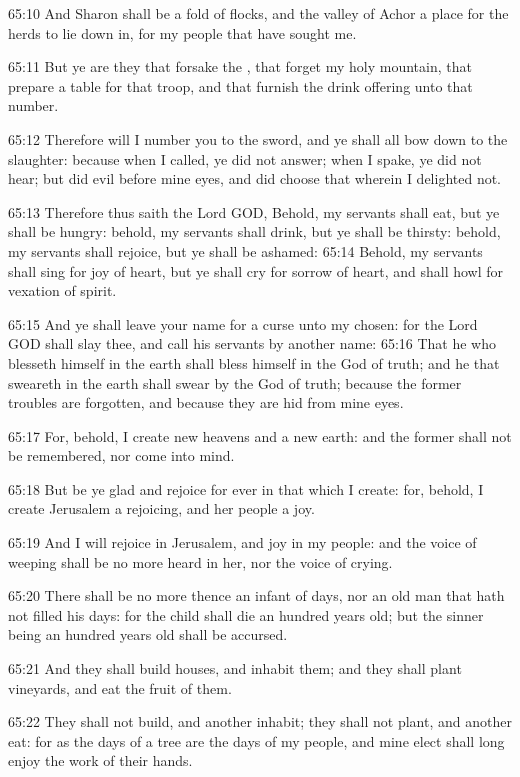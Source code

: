 65:10 And Sharon shall be a fold of flocks, and the valley of Achor a
place for the herds to lie down in, for my people that have sought me.

65:11 But ye are they that forsake the \LORD, that forget my holy
mountain, that prepare a table for that troop, and that furnish the
drink offering unto that number.

65:12 Therefore will I number you to the sword, and ye shall all bow
down to the slaughter: because when I called, ye did not answer; when
I spake, ye did not hear; but did evil before mine eyes, and did
choose that wherein I delighted not.

65:13 Therefore thus saith the Lord GOD, Behold, my servants shall
eat, but ye shall be hungry: behold, my servants shall drink, but ye
shall be thirsty: behold, my servants shall rejoice, but ye shall be
ashamed: 65:14 Behold, my servants shall sing for joy of heart, but ye
shall cry for sorrow of heart, and shall howl for vexation of spirit.

65:15 And ye shall leave your name for a curse unto my chosen: for the
Lord GOD shall slay thee, and call his servants by another name: 65:16
That he who blesseth himself in the earth shall bless himself in the
God of truth; and he that sweareth in the earth shall swear by the God
of truth; because the former troubles are forgotten, and because they
are hid from mine eyes.

65:17 For, behold, I create new heavens and a new earth: and the
former shall not be remembered, nor come into mind.

65:18 But be ye glad and rejoice for ever in that which I create: for,
behold, I create Jerusalem a rejoicing, and her people a joy.

65:19 And I will rejoice in Jerusalem, and joy in my people: and the
voice of weeping shall be no more heard in her, nor the voice of
crying.

65:20 There shall be no more thence an infant of days, nor an old man
that hath not filled his days: for the child shall die an hundred
years old; but the sinner being an hundred years old shall be
accursed.

65:21 And they shall build houses, and inhabit them; and they shall
plant vineyards, and eat the fruit of them.

65:22 They shall not build, and another inhabit; they shall not plant,
and another eat: for as the days of a tree are the days of my people,
and mine elect shall long enjoy the work of their hands.

